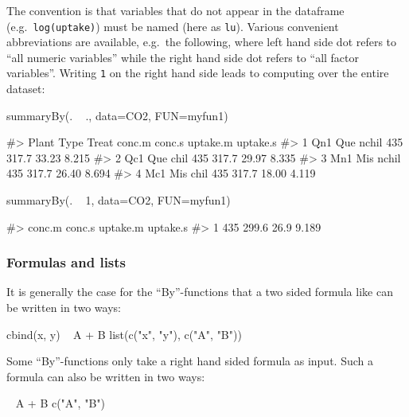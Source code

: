 The convention is that variables that do not appear in the dataframe
(e.g.~\texttt{log(uptake)}) must be named (here as \texttt{lu}). Various
convenient abbreviations are available, e.g.~the following, where left
hand side dot refers to ``all numeric variables'' while the right hand
side dot refers to ``all factor variables''. Writing \texttt{1} on the
right hand side leads to computing over the entire dataset:

\begin{Schunk}
\begin{Sinput}
summaryBy(. ~ ., data=CO2, FUN=myfun1)
\end{Sinput}
\begin{Soutput}
#>   Plant Type Treat conc.m conc.s uptake.m uptake.s
#> 1   Qn1  Que nchil    435  317.7    33.23    8.215
#> 2   Qc1  Que  chil    435  317.7    29.97    8.335
#> 3   Mn1  Mis nchil    435  317.7    26.40    8.694
#> 4   Mc1  Mis  chil    435  317.7    18.00    4.119
\end{Soutput}
\begin{Sinput}
summaryBy(. ~ 1, data=CO2, FUN=myfun1)
\end{Sinput}
\begin{Soutput}
#>   conc.m conc.s uptake.m uptake.s
#> 1    435  299.6     26.9    9.189
\end{Soutput}
\end{Schunk}

\hypertarget{formulas-and-lists}{%
\subsubsection{Formulas and lists}\label{formulas-and-lists}}

It is generally the case for the ``By''-functions that a two sided
formula like can be written in two ways:

\begin{Schunk}
\begin{Sinput}
cbind(x, y) ~ A + B
list(c("x", "y"), c("A", "B"))
\end{Sinput}
\end{Schunk}

Some ``By''-functions only take a right hand sided formula as input.
Such a formula can also be written in two ways:

\begin{Schunk}
\begin{Sinput}
~ A + B
c("A", "B")
\end{Sinput}
\end{Schunk}

